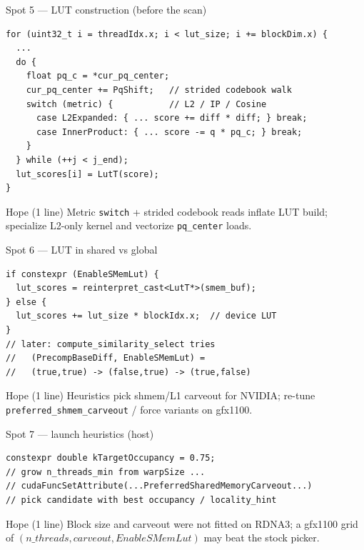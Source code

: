 \documentclass[aspectratio=169,10pt]{beamer}
\begin{document}
\begin{frame}[fragile]{Spot 5 --- LUT construction (before the scan)}
\begin{lstlisting}
for (uint32_t i = threadIdx.x; i < lut_size; i += blockDim.x) {
  ...
  do {
    float pq_c = *cur_pq_center;
    cur_pq_center += PqShift;   // strided codebook walk
    switch (metric) {           // L2 / IP / Cosine
      case L2Expanded: { ... score += diff * diff; } break;
      case InnerProduct: { ... score -= q * pq_c; } break;
    }
  } while (++j < j_end);
  lut_scores[i] = LutT(score);
}
\end{lstlisting}
  \vspace{0.3em}
  \begin{alertblock}{Hope (1 line)}
    Metric \texttt{switch} + strided codebook reads inflate LUT build;
    specialize L2-only kernel and vectorize \texttt{pq\_center} loads.
  \end{alertblock}
\end{frame}

\begin{frame}[fragile]{Spot 6 --- LUT in shared vs global}
\begin{lstlisting}
if constexpr (EnableSMemLut) {
  lut_scores = reinterpret_cast<LutT*>(smem_buf);
} else {
  lut_scores += lut_size * blockIdx.x;  // device LUT
}
// later: compute_similarity_select tries
//   (PrecompBaseDiff, EnableSMemLut) =
//   (true,true) -> (false,true) -> (true,false)
\end{lstlisting}
  \vspace{0.3em}
  \begin{alertblock}{Hope (1 line)}
    Heuristics pick shmem/L1 carveout for NVIDIA; re-tune
    \texttt{preferred\_shmem\_carveout} / force variants on gfx1100.
  \end{alertblock}
\end{frame}

\begin{frame}[fragile]{Spot 7 --- launch heuristics (host)}
\begin{lstlisting}
constexpr double kTargetOccupancy = 0.75;
// grow n_threads_min from warpSize ...
// cudaFuncSetAttribute(...PreferredSharedMemoryCarveout...)
// pick candidate with best occupancy / locality_hint
\end{lstlisting}
  \vspace{0.3em}
  \begin{alertblock}{Hope (1 line)}
    Block size and carveout were not fitted on RDNA3; a gfx1100 grid of
    $(n\_threads, carveout, EnableSMemLut)$ may beat the stock picker.
  \end{alertblock}
\end{frame}
\end{document}
